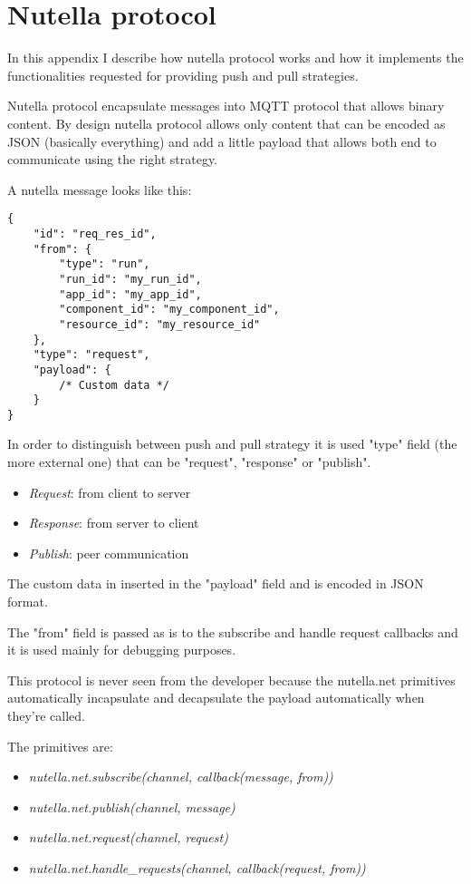 \chapter{Nutella protocol}

\label{apdx:nutella_protocol}

In this appendix I describe how nutella protocol works and how it implements the functionalities requested for providing push and pull strategies.

Nutella protocol encapsulate messages into MQTT protocol that allows binary content. By design nutella protocol allows only content that can be encoded as JSON (basically everything) and add a little payload that allows both end to communicate using the right strategy.

A nutella message looks like this:

\begin{lstlisting}[language=NutellaProtocol]
{
    "id": "req_res_id",
    "from": {
        "type": "run",
        "run_id": "my_run_id",
        "app_id": "my_app_id",
        "component_id": "my_component_id",
        "resource_id": "my_resource_id"
    },
    "type": "request",
    "payload": {
        /* Custom data */
    }
}
\end{lstlisting}

In order to distinguish between push and pull strategy it is used "type" field (the more external one) that can be "request", "response" or "publish".
\begin{itemize}
    \item \textit{Request}: from client to server
    \item \textit{Response}: from server to client
    \item \textit{Publish}: peer communication
\end{itemize}

The custom data in inserted in the "payload" field and is encoded in JSON format.

The "from" field is passed as is to the subscribe and handle request callbacks and it is used mainly for debugging purposes.

This protocol is never seen from the developer because the nutella.net primitives automatically incapsulate and decapsulate the payload automatically when they're called.

The primitives are:
\begin{itemize}
    \item \textit{nutella.net.subscribe(channel, callback(message, from))}
    \item \textit{nutella.net.publish(channel, message)}
    \item \textit{nutella.net.request(channel, request)}
    \item \textit{nutella.net.handle\_requests(channel, callback(request, from))}
\end{itemize}